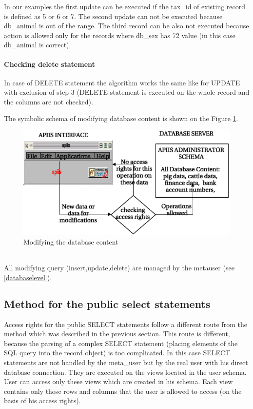 In our examples the first update can be executed if the tax\_id of existing record is defined as 5 or 6 or 7. The second update can not be executed because db\_animal is out of the range. The third record can be also not executed because action is allowed only for the records where db\_sex has 72 value (in this case db\_animal is correct). 

\paragraph{\textbf{Checking delete statement}}
In case of DELETE statement the algorithm works the same like for UPDATE with exclusion of step 3 (DELETE statement is executed on the whole record and the columns are not checked).

The symbolic schema of modifying database content is shown on the Figure \ref{fig:modifingdata}.
\begin{figure}[h]
\begin{center}
   \includegraphics[scale=1]{./access-control/modifingdata.eps}
   \caption{Modifying the database content}
   \label{fig:modifingdata}
\end{center}
\end{figure}
\\All modifying query (insert,update,delete) are managed by the metauser (see \ref{databaselevel}).

\newpage

\subsection{Method for the public select statements\label{select}}

Access rights for the public SELECT statements follow a different route from the method
which was described in the previous section. This route is different, because the parsing of a complex SELECT statement (placing elements of the SQL query into the record object) is too complicated.
In this case SELECT statements are not handled by the meta\_user but by the real user with his direct database connection. They are executed on the views located in the user schema. User can access only these views which are created in his schema. Each view contains only those rows and columns that the user is allowed to access (on the basis of his access rights).

